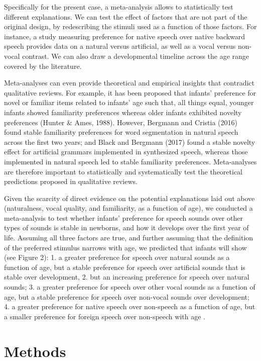 \documentclass[man]{apa6}
\begin{document}
Specifically for the present case, a meta-analysis allows to
statistically test different explanations. We can test the effect of
factors that are not part of the original design, by redescribing the
stimuli used as a function of those factors. For instance, a study
measuring preference for native speech over native backward speech
provides data on a natural versus artificial, as well as a vocal versus
non-vocal contrast. We can also draw a developmental timeline across the
age range covered by the literature.

Meta-analyses can even provide theoretical and empirical insights that
contradict qualitative reviews. For example, it has been proposed that
infants' preference for novel or familiar items related to infants' age
such that, all things equal, younger infants showed familiarity
preferences whereas older infants exhibited novelty preferences (Hunter
\& Ames, 1988). However, Bergmann and Cristia (2016) found stable
familiarity preferences for word segmentation in natural speech across
the first two years; and Black and Bergmann (2017) found a stable
novelty effect for artificial grammars implemented in synthesized
speech, whereas those implemented in natural speech led to stable
familiarity preferences. Meta-analyses are therefore important to
statistically and systematically test the theoretical predictions
proposed in qualitative reviews.

Given the scarcity of direct evidence on the potential explanations laid
out above (naturalness, vocal quality, and familiarity, as a function of
age), we conducted a meta-analysis to test whether infants' preference
for speech sounds over other types of sounds is stable in newborns, and
how it develops over the first year of life. Assuming all three factors
are true, and further assuming that the definition of the preferred
stimulus narrows with age, we predicted that infants will show (see
Figure 2): 1. a greater preference for speech over natural sounds as a
function of age, but a stable preference for speech over artificial
sounds that is stable over development, 2. but an increasing preference
for speech over natural sounds; 3. a greater preference for speech over
other vocal sounds as a function of age, but a stable preference for
speech over non-vocal sounds over development; 4. a greater preference
for native speech over non-speech as a function of age, but a smaller
preference for foreign speech over non-speech with age .

\section{Methods}\label{methods}
\end{document}
